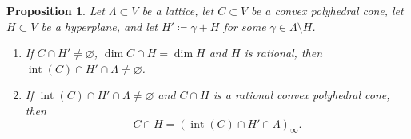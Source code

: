 \documentclass[11pt]{article}
\numberwithin{equation}{section}
\theoremstyle{plain}
\newtheorem{proposition}[theorem]{Proposition}
\theoremstyle{definition}
\DeclareMathOperator{\inter}{int}
\begin{document}
\begin{proposition}
\label{prop.Weights_facet}
Let $\Lambda \subset V$ be a lattice, let $C \subset V$ be a convex polyhedral cone,
let $H \subset V$ be a hyperplane, and let $H' \coloneqq \gamma + H$ for some
$\gamma \in \Lambda \setminus H$.
\begin{enumerate}
\item
\label{prop.Weights_facet1}
If $C \cap H' \neq \varnothing$, $\dim C \cap H = \dim H$ and $H$ is rational, then
$\inter(C) \cap H' \cap \Lambda \neq \varnothing$.
\item
\label{prop.Weights_facet2}
If $\inter(C) \cap H' \cap \Lambda \neq \varnothing$ and
$C \cap H$ is a rational convex polyhedral cone, then
\[
C \cap H = (\inter(C) \cap H' \cap \Lambda)_{\infty}.
\]
\end{enumerate}
\end{proposition}
\end{document}
